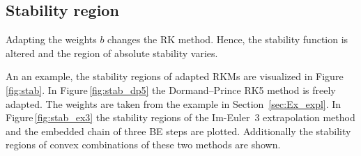\documentclass[a4paper]{article}
\numberwithin{equation}{section}
\theoremstyle{plain}
\theoremstyle{definition}
\numberwithin{theorem}{section}
\newcommand{\1}{\mathbbm{1}}
\begin{document}
\subsection{Stability region}

Adapting the weights $b$ changes the RK method. Hence, the stability
function is altered and the region of absolute stability varies.

An an example, the stability regions of adapted RKMs are visualized in
Figure\,\ref{fig:stab}.
In Figure\,\ref{fig:stab_dp5} the Dormand--Prince RK5 method is freely adapted.
The weights are taken from the example in Section~\ref{sec:Ex_expl}.
In Figure\,\ref{fig:stab_ex3} the stability regions of the Im-Euler~3
extrapolation method and the embedded chain of three BE steps are
plotted. Additionally the stability regions of convex combinations
of these two methods are shown.
\end{document}
